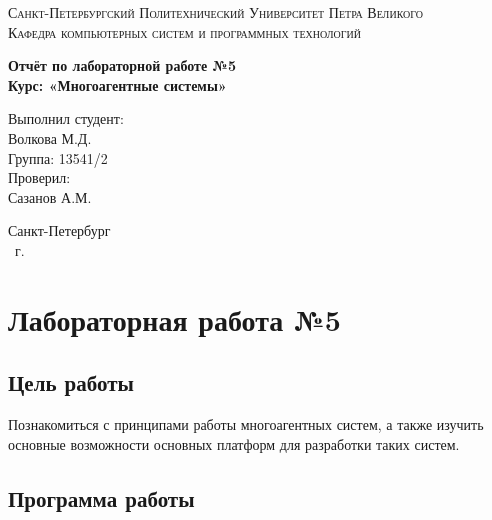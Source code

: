 \documentclass[14pt,a4paper,report]{report}
\begin{document}
\def\contentsname{Содержание}

\begin{titlepage}
	\begin{center}
		\textsc{Санкт-Петербургский Политехнический 
			Университет Петра Великого\\[5mm]
			Кафедра компьютерных систем и программных технологий}
		
		\vfill
		
		\textbf{Отчёт по лабораторной работе №5\\[3mm]
			Курс: «Многоагентные системы»\\[41mm]
		}
	\end{center}
	
	\hfill
	\begin{minipage}{.4\textwidth}
		Выполнил студент:\\[2mm] 
		Волкова М.Д.\\
		Группа: 13541/2\\[5mm]
		
		Проверил:\\[2mm] 
		Сазанов А.М.
	\end{minipage}
	\vfill
	\begin{center}
		Санкт-Петербург\\ \the\year\ г.
	\end{center}
\end{titlepage}

\tableofcontents
\clearpage

\chapter{Лабораторная работа №5}

\section{Цель работы}

Познакомиться с принципами работы многоагентных систем, а также изучить основные возможности основных платформ для разработки таких систем.

\section{Программа работы}
\end{document}
